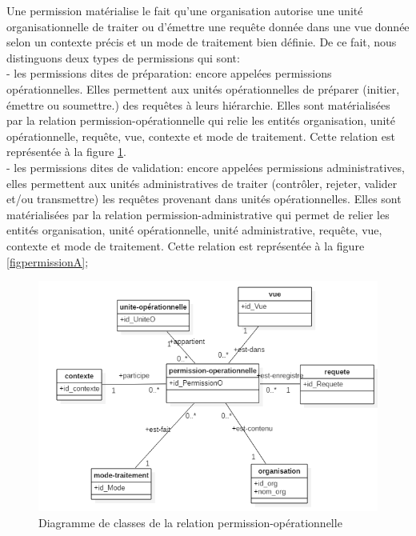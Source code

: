 \label{sectionPermission}

Une permission matérialise le fait qu'une organisation autorise une unité organisationnelle de traiter ou d'émettre une requête donnée dans une vue donnée selon un contexte précis et un mode de traitement bien définie. De ce fait, nous distinguons deux types de permissions qui sont:\\
- les permissions dites de préparation: encore appelées permissions opérationnelles. Elles permettent aux unités opérationnelles de préparer (initier, émettre ou soumettre.) des requêtes à leurs hiérarchie. Elles sont matérialisées par la relation permission-opérationnelle qui relie les entités organisation, unité opérationnelle, requête, vue, contexte et mode de traitement. Cette relation est représentée à la figure \ref{figpermissionO}.\\
- les permissions dites de validation: encore appelées permissions administratives, elles permettent aux unités administratives de traiter (contrôler, rejeter, valider et/ou transmettre) les requêtes  provenant dans unités opérationnelles. Elles sont matérialisées par la relation permission-administrative qui permet de relier les entités organisation, unité opérationnelle, unité administrative, requête, vue, contexte et mode de traitement. Cette relation est représentée à la figure \ref{figpermissionA};

\begin{figure}[h!]
    \centering
		\includegraphics[scale=0.7]{chap3/images/permissionO.png}
    \caption{Diagramme de classes de la relation permission-opérationnelle}
	 \label{figpermissionO}
\end{figure} 

